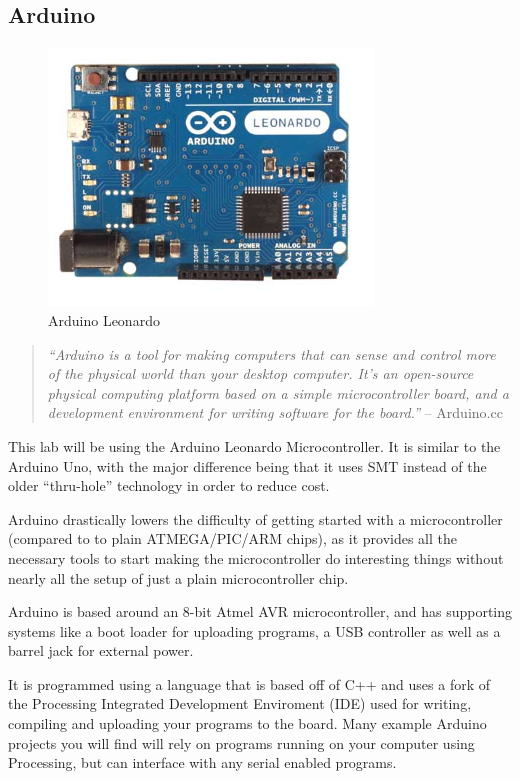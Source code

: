\documentclass[11pt,a4paper]{article}
\begin{document}
\subsection{Arduino} %
\label{sub:arduino}

\begin{figure}[htbp]
	\centering
		\includegraphics[height=2.7in]{figures/ArduinoLeonardoFront_2_450px.jpg}
	\caption{Arduino Leonardo\cite{leonardo}}
	\label{fig:figures_ArduinoLeonardoFront_2_450px}
\end{figure}


\begin{quote}
\emph{``Arduino is a tool for making computers that can sense and control more of the physical world than your desktop computer. It's an open-source physical computing platform based on a simple microcontroller board, and a development environment for writing software for the board.''} -- Arduino.cc\cite{arduino_guide}
\end{quote}

This lab will be using the Arduino Leonardo Microcontroller\cite{leonardo}.  It is similar to the Arduino Uno\cite{uno}, with the major difference being that it uses SMT\cite{smt} instead of the older ``thru-hole''\cite{th} technology in order to reduce cost.

Arduino drastically lowers the difficulty of getting started with a microcontroller (compared to to plain ATMEGA/PIC/ARM chips), as it provides all the necessary tools to start making the microcontroller do interesting things without nearly all the setup of just a plain microcontroller chip.

Arduino is based around an 8-bit Atmel AVR microcontroller, and has supporting systems like a boot loader for uploading programs, a USB controller as well as a barrel jack for external power.

It is programmed using a language that is based off of C++ and uses a fork of the Processing Integrated Development Enviroment (IDE) used for writing, compiling and uploading your programs to the board.  Many example Arduino projects you will find will rely on programs running on your computer using Processing, but can interface with any serial enabled programs.\cite{processing}
\end{document}
